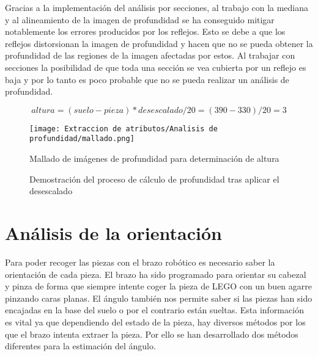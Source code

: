 Gracias a la implementación del análisis por secciones, al trabajo con la mediana y al alineamiento de la imagen de profundidad se ha conseguido mitigar notablemente los errores producidos por los reflejos. Esto se debe a que los reflejos distorsionan la imagen de profundidad y hacen que no se pueda obtener la profundidad de las regiones de la imagen afectadas por estos. Al trabajar con secciones la posibilidad de que toda una sección se vea cubierta por un reflejo es baja y por lo tanto es poco probable que no se pueda realizar un análisis de profundidad.

\begin{equation}\label{eq:profundidad}
		altura = (suelo - pieza)* desescalado/20 = (390-330)/20 = 3
\end{equation}

\begin{figure}[ht]
	\centering
	\texttt{[image: Extraccion de atributos/Analisis de profundidad/mallado.png]}
	\caption{Mallado de imágenes de profundidad para determinación de altura}
	\label{fig:Profundidad mallado}
	\vspace{-5pt}
\end{figure}
	
\begin{figure}[ht]  %
  \hfill	
  \hfill	
\caption{Demostración del proceso de cálculo de profundidad tras aplicar el desescalado}
\label{fig:Profundidad ejemplo}
\vspace{-5pt}
\end{figure}

\newpage
\section{Análisis de la orientación}
Para poder recoger las piezas con el brazo robótico es necesario saber la orientación de cada pieza. El brazo ha sido programado para orientar su cabezal y pinza de forma que siempre intente coger la pieza de LEGO con un buen agarre pinzando caras planas. El ángulo también nos permite saber si las piezas han sido encajadas en la base del suelo o por el contrario están sueltas. Esta información es vital ya que dependiendo del estado de la pieza, hay diversos métodos por los que el brazo intenta extraer la pieza. Por ello se han desarrollado dos métodos diferentes para la estimación del ángulo.

